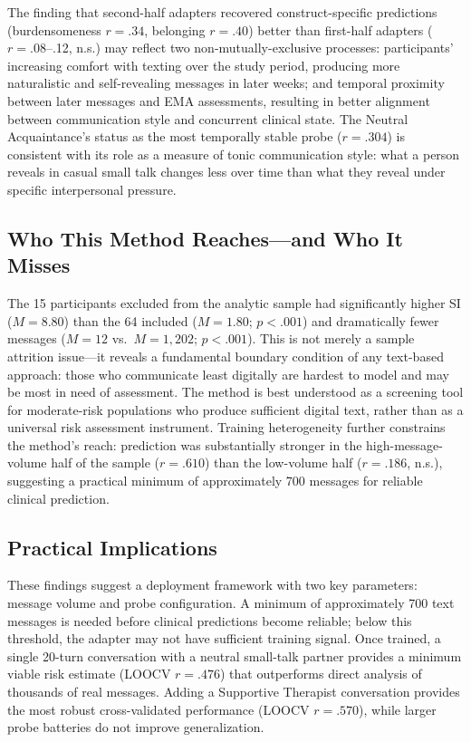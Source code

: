 \documentclass[review,12pt,authoryear]{elsarticle}
\begin{document}
The finding that second-half adapters recovered construct-specific predictions (burdensomeness $r = .34$, belonging $r = .40$) better than first-half adapters ($r = .08$--.12, n.s.) may reflect two non-mutually-exclusive processes: participants' increasing comfort with texting over the study period, producing more naturalistic and self-revealing messages in later weeks; and temporal proximity between later messages and EMA assessments, resulting in better alignment between communication style and concurrent clinical state. The Neutral Acquaintance's status as the most temporally stable probe ($r = .304$) is consistent with its role as a measure of tonic communication style: what a person reveals in casual small talk changes less over time than what they reveal under specific interpersonal pressure.

\subsection{Who This Method Reaches---and Who It Misses}

The 15 participants excluded from the analytic sample had significantly higher SI ($M = 8.80$) than the 64 included ($M = 1.80$; $p < .001$) and dramatically fewer messages ($M = 12$ vs.\ $M = 1{,}202$; $p < .001$). This is not merely a sample attrition issue---it reveals a fundamental boundary condition of any text-based approach: those who communicate least digitally are hardest to model and may be most in need of assessment. The method is best understood as a screening tool for moderate-risk populations who produce sufficient digital text, rather than as a universal risk assessment instrument. Training heterogeneity further constrains the method's reach: prediction was substantially stronger in the high-message-volume half of the sample ($r = .610$) than the low-volume half ($r = .186$, n.s.), suggesting a practical minimum of approximately 700 messages for reliable clinical prediction.

\subsection{Practical Implications}

These findings suggest a deployment framework with two key parameters: message volume and probe configuration. A minimum of approximately 700 text messages is needed before clinical predictions become reliable; below this threshold, the adapter may not have sufficient training signal. Once trained, a single 20-turn conversation with a neutral small-talk partner provides a minimum viable risk estimate (LOOCV $r = .476$) that outperforms direct analysis of thousands of real messages. Adding a Supportive Therapist conversation provides the most robust cross-validated performance (LOOCV $r = .570$), while larger probe batteries do not improve generalization.
\end{document}

